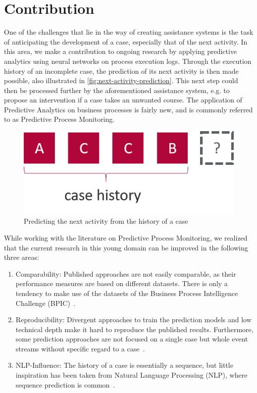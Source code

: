 \section{Contribution}\label{sec:intro:contribution}
One of the challenges that lie in the way of creating assistance systems is the task of anticipating the development of a case, especially that of the next activity. In this area, we make a contribution to ongoing research by applying predictive analytics using neural networks on process execution logs. Through the execution history of an incomplete case, the prediction of its next activity is then made possible, also illustrated in \autoref{fig:next-activity-prediction}. This next step could then be processed further by the aforementioned assistance system, e.g. to propose an intervention if a case takes an unwanted course. The application of Predictive Analytics on business processes is fairly new, and is commonly referred to as Predictive Process Monitoring.\\

\begin{figure}
    \centering
    \includegraphics[width=\textwidth]{gfx/next-activity.png}
    \caption{Predicting the next activity from the history of a case}
    \label{fig:next-activity-prediction}
\end{figure}

While working with the literature on Predictive Process Monitoring, we realized that the current research in this young domain can be improved in the following three areas:

\begin{enumerate}
    \item Comparability: Published approaches are not easily comparable, as their performance measures are based on different datasets. There is only a tendency to make use of the datasets of the Business Process Intelligence Challenge (BPIC)~\cite{BPIC2011, BPIC2012, BPIC2015, BPIC2017}.
    \item Reproducibility: Divergent approaches to train the prediction models and low technical depth make it hard to reproduce the published results. Furthermore, some prediction approaches are not focused on a single case but whole event streams without specific regard to a case~\cite{evermann2016, schoenig2018}.
    \item NLP-Influence: The history of a case is essentially a sequence, but little inspiration has been taken from Natural Language Processing (NLP), where sequence prediction is common~\cite{shibata2016bipartite}.
\end{enumerate}

